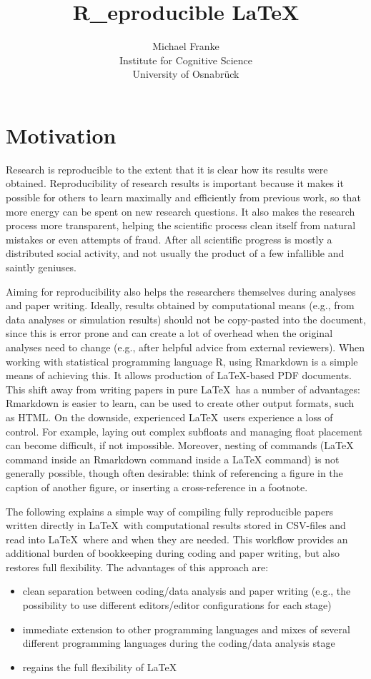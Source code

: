 \documentclass[fleqn,reqno,10pt]{article}
\title{R\_eproducible \LaTeX}
\author{Michael Franke \\ Institute for Cognitive Science \\ University of Osnabr\"uck}
\date{}
\begin{document}
\maketitle

\section*{Motivation}

Research is reproducible to the extent that it is clear how its results were
obtained. Reproducibility of research results is important because it makes it possible for
others to learn maximally and efficiently from previous work, so that more energy can be spent
on new research questions. It also makes the research process more transparent, helping the
scientific process clean itself from natural mistakes or even attempts of fraud. After all
scientific progress is mostly a distributed social activity, and not usually the product of a
few infallible and saintly geniuses.

Aiming for reproducibility also helps the researchers themselves during analyses and paper
writing. Ideally, results obtained by computational means (e.g., from data analyses or
simulation results) should not be copy-pasted into the document, since this is error prone and
can create a lot of overhead when the original analyses need to change (e.g., after helpful
advice from external reviewers). When working with statistical programming language R, using
Rmarkdown is a simple means of achieving this. It allows production of \LaTeX-based PDF
documents. This shift away from writing papers in pure \LaTeX\ has a number of advantages:
Rmarkdown is easier to learn, can be used to create other output formats, such as HTML. On the
downside, experienced \LaTeX\ users experience a loss of control. For example, laying out
complex subfloats and managing float placement can become difficult, if not
impossible. Moreover, nesting of commands (LaTeX command inside an Rmarkdown command inside a
LaTeX command) is not generally possible, though often desirable: think of referencing a figure
in the caption of another figure, or inserting a cross-reference in a footnote.

The following explains a simple way of compiling fully reproducible papers written directly in
\LaTeX\ with computational results stored in CSV-files and read into \LaTeX\ where and when
they are needed. This workflow provides an additional burden of bookkeeping during coding and
paper writing, but also restores full flexibility. The advantages of this approach are:
\begin{itemize}
\item clean separation between coding/data analysis and paper writing (e.g., the possibility to
  use different editors/editor configurations for each stage)
\item immediate extension to other programming languages and mixes of several different
  programming languages during the coding/data analysis stage
\item regains the full flexibility of \LaTeX
\end{itemize}
\end{document}
